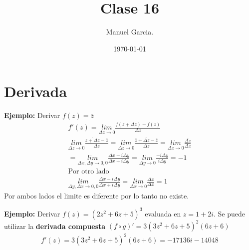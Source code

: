 \documentclass{article}
\title{Clase 16}
\author{Manuel Garcia.}
\date{\today}
\begin{document}
\maketitle

\section{Derivada}
\textbf{Ejemplo: } Derivar $ f(z) = \bar z  $
\begin{gather*}
  f'(z) = \underset{\Delta z  \rightarrow 0 }{lim}\frac{f(z + \Delta z ) - f(z) }{\Delta z }\\
  \underset{\Delta z  \rightarrow 0 }{lim}\frac{\overline{z + \Delta z } - \bar z }{\Delta z } = \underset{\Delta z  \rightarrow 0 }{lim}\frac{\bar z + \overline{\Delta z} - \bar z }{\Delta z } = \underset{\Delta z  \rightarrow 0 }{lim}\frac{\bar{\Delta z }}{\Delta z }\\
  = \underset{\Delta x , \Delta y  \rightarrow 0,0 }{lim}\frac{\Delta x - i \Delta y }{\Delta x + i \Delta y } = \underset{\Delta y  \rightarrow 0 }{lim}\frac{-i  \Delta y }{i \Delta y  } = - 1\\
  \text{Por otro lado }\\
  \underset{\Delta y , \Delta x  \rightarrow 0,0 }{lim}\frac{\Delta x - i \Delta y }{\Delta x + i \Delta y } = \underset{\Delta x  \rightarrow 0 }{lim}\frac{\Delta x }{\Delta x } = 1 
\end{gather*}
Por ambos lados el limite es diferente por lo tanto no existe.

\textbf{Ejemplo: } Derivar $ f(z) = \left(2 z ^2 + 6 z + 5 \right)^3  $ evaluada en $ z = 1 + 2 i  $. Se puede utilizar la \textbf{derivada compuesta } $ (f \circ g )' = 3 (3z ^2 + 6 z + 5 ) ^2 (6z + 6 ) $
\begin{gather*}
  f'(z) = 3 (3 z ^2 + 6 z + 5 )^2 (6z + 6 ) = -17136i - 14048 
\end{gather*}
\end{document}
